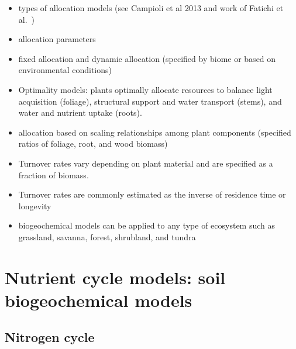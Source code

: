 \documentclass[
  oneside]{book}
\begin{document}
\begin{itemize}
\item
  types of allocation models (see Campioli et al 2013 and work of Fatichi et al.~)
\item
  allocation parameters
\item
  fixed allocation and dynamic allocation (specified by biome or based on environmental conditions)
\item
  Optimality models: plants optimally allocate resources to balance light acquisition (foliage), structural support and water transport (stems), and water and nutrient uptake (roots).
\item
  allocation based on scaling relationships among plant components (specified ratios of foliage, root, and wood biomass)
\item
  Turnover rates vary depending on plant material and are specified as a fraction of biomass.
\item
  Turnover rates are commonly estimated as the inverse of residence time or longevity
\item
  biogeochemical models can be applied to any type of ecosystem such as grassland, savanna, forest, shrubland, and tundra
\end{itemize}

\hypertarget{nutrient-cycle-models-soil-biogeochemical-models}{%
\section{Nutrient cycle models: soil biogeochemical models}\label{nutrient-cycle-models-soil-biogeochemical-models}}

\hypertarget{nitrogen-cycle}{%
\subsection{Nitrogen cycle}\label{nitrogen-cycle}}
\end{document}
